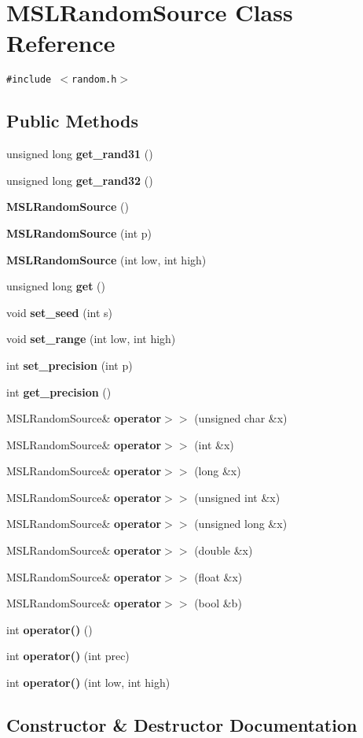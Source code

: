 \section{MSLRandom\-Source  Class Reference}
\label{class_MSLRandomSource}
{\tt \#include $<$random.h$>$}

\subsection*{Public Methods}
\begin{CompactItemize}
\item 
unsigned long {\bf get\_\-rand31} ()
\item 
unsigned long {\bf get\_\-rand32} ()
\item 
{\bf MSLRandom\-Source} ()
\item 
{\bf MSLRandom\-Source} (int p)
\item 
{\bf MSLRandom\-Source} (int low, int high)
\item 
unsigned long {\bf get} ()
\item 
void {\bf set\_\-seed} (int s)
\item 
void {\bf set\_\-range} (int low, int high)
\item 
int {\bf set\_\-precision} (int p)
\item 
int {\bf get\_\-precision} ()
\item 
MSLRandom\-Source\& {\bf operator$>$$>$} (unsigned char \&x)
\item 
MSLRandom\-Source\& {\bf operator$>$$>$} (int \&x)
\item 
MSLRandom\-Source\& {\bf operator$>$$>$} (long \&x)
\item 
MSLRandom\-Source\& {\bf operator$>$$>$} (unsigned int \&x)
\item 
MSLRandom\-Source\& {\bf operator$>$$>$} (unsigned long \&x)
\item 
MSLRandom\-Source\& {\bf operator$>$$>$} (double \&x)
\item 
MSLRandom\-Source\& {\bf operator$>$$>$} (float \&x)
\item 
MSLRandom\-Source\& {\bf operator$>$$>$} (bool \&b)
\item 
int {\bf operator()} ()
\item 
int {\bf operator()} (int prec)
\item 
int {\bf operator()} (int low, int high)
\end{CompactItemize}


\subsection{Constructor \& Destructor Documentation}
